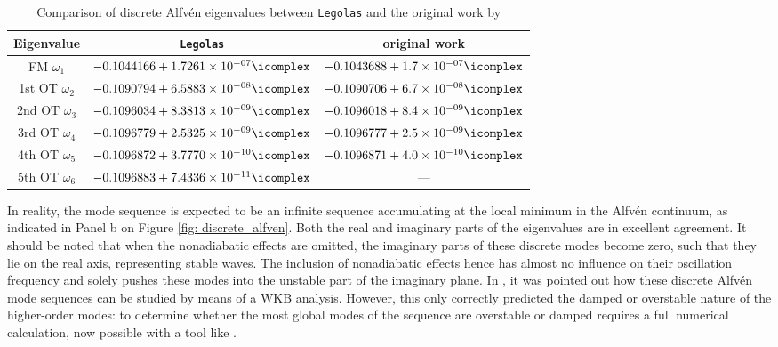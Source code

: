 \begin{table}[t]
	\centering
	\caption{
    Comparison of discrete Alfv\'en eigenvalues between \texttt{Legolas} and the original work by \citet{keppens1993}
  }
	\begin{tabular}{c c c}
		\hline
		\textbf{Eigenvalue}		&		\texttt{Legolas}									&				original work	\\
		\hline
      FM $\omega_1$	    &	$-0.1044166 + 1.7261\times 10^{-07}\icomplex$	&	$-0.1043688 + 1.7\times 10^{-07}\icomplex$	\\
      1st OT $\omega_2$	&	$-0.1090794 + 6.5883\times 10^{-08}\icomplex$	&	$-0.1090706 + 6.7\times 10^{-08}\icomplex$	\\
      2nd OT $\omega_3$	&	$-0.1096034 + 8.3813\times 10^{-09}\icomplex$	&	$-0.1096018 + 8.4\times 10^{-09}\icomplex$	\\
      3rd OT $\omega_4$ &	$-0.1096779 + 2.5325\times 10^{-09}\icomplex$	&	$-0.1096777 + 2.5\times 10^{-09}\icomplex$	\\
      4th OT $\omega_5$	&	$-0.1096872 + 3.7770\times 10^{-10}\icomplex$	&	$-0.1096871 + 4.0\times 10^{-10}\icomplex$	\\
      5th OT $\omega_6$	&	$-0.1096883 + 7.4336\times 10^{-11}\icomplex$	&					---
	\end{tabular}
	\label{tab: discrete_alfven}
\end{table}

In reality, the mode sequence is expected to be an infinite sequence accumulating at the local minimum in the Alfv\'en continuum, as indicated in Panel b on Figure \ref{fig: discrete_alfven}. Both the real and imaginary parts of the eigenvalues are in excellent agreement. It should be noted that when the nonadiabatic effects are omitted, the imaginary parts of these discrete modes become zero, such that they lie on the real axis, representing stable waves. The inclusion of nonadiabatic effects hence has almost no influence on their oscillation frequency and solely pushes these modes into the unstable part of the imaginary plane. In \citet{keppens1993}, it was pointed out how these discrete Alfv\'en mode sequences can be studied by means of a WKB analysis. However, this only correctly predicted the damped or overstable nature of the higher-order modes: to determine whether the most global modes of the sequence are overstable or damped requires a full numerical calculation, now possible with a tool like {\legolas}.


